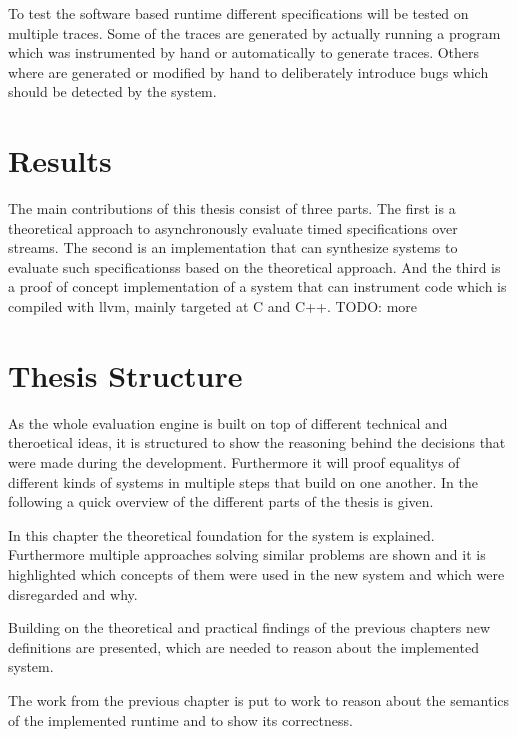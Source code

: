 To test the software based runtime different specifications will be tested on multiple traces.
Some of the traces are generated by actually running a program which was instrumented by hand or automatically to generate traces.
Others where are generated or modified by hand to deliberately introduce bugs which should be detected by the system.

\section{Results}
\label{sec:intro:results}

The main contributions of this thesis consist of three parts.
The first is a theoretical approach to asynchronously evaluate timed specifications over streams.
The second is an implementation that can synthesize systems to evaluate such specificationss based on the theoretical approach.
And the third is a proof of concept implementation of a system that can instrument code which is compiled with \gls{llvm}, mainly targeted at C and C++.
TODO: more


\section{Thesis Structure}
\label{sec:intro:structure}

As the whole evaluation engine is built on top of different technical and theroetical ideas, it is structured to show
the reasoning behind the decisions that were made during the development.
Furthermore it will proof equalitys of different kinds of systems in multiple steps that build on one another.
In the following a quick overview of the different parts of the thesis is given.

\textbf{}

In this chapter the theoretical foundation for the system is explained.
Furthermore multiple approaches solving similar problems are shown and it is highlighted which concepts of them were
used in the new system and which were disregarded and why.


\textbf{}

Building on the theoretical and practical findings of the previous chapters new definitions are presented, which are needed to reason about the implemented system.

\textbf{}

The work from the previous chapter is put to work to reason about the semantics of the implemented runtime and to show its correctness.

